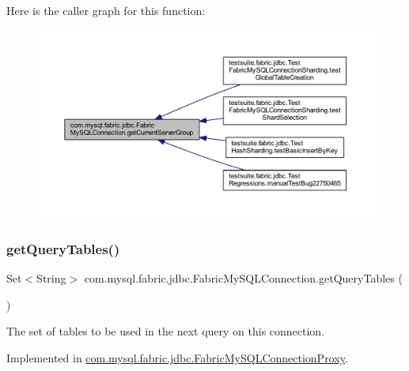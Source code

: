Here is the caller graph for this function\+:\nopagebreak
\begin{figure}[H]
\begin{center}
\leavevmode
\includegraphics[width=350pt]{interfacecom_1_1mysql_1_1fabric_1_1jdbc_1_1_fabric_my_s_q_l_connection_a45d6ee9742db0ea16e51e0db018a41d2_icgraph}
\end{center}
\end{figure}
\mbox{\label{interfacecom_1_1mysql_1_1fabric_1_1jdbc_1_1_fabric_my_s_q_l_connection_a9f655bdcae5f7aac562367444ab61d7a}} 
\subsubsection{\texorpdfstring{get\+Query\+Tables()}{getQueryTables()}}
{\footnotesize\ttfamily Set$<$String$>$ com.\+mysql.\+fabric.\+jdbc.\+Fabric\+My\+S\+Q\+L\+Connection.\+get\+Query\+Tables (\begin{DoxyParamCaption}{ }\end{DoxyParamCaption})}

The set of tables to be used in the next query on this connection. 

Implemented in \mbox{\hyperlink{classcom_1_1mysql_1_1fabric_1_1jdbc_1_1_fabric_my_s_q_l_connection_proxy_ab217c713b9e7e0795e5ad799a72fa0cb}{com.\+mysql.\+fabric.\+jdbc.\+Fabric\+My\+S\+Q\+L\+Connection\+Proxy}}.

